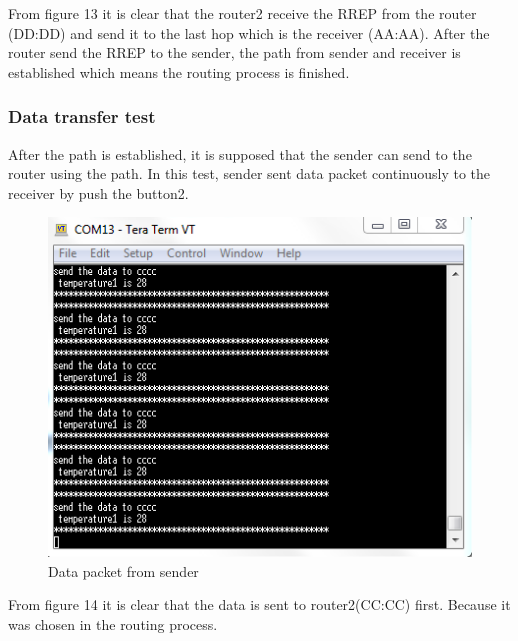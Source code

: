 \documentclass[a4paper]{article}
\begin{document}
From figure 13 it is clear that the router2 receive the RREP from the router (DD:DD) and send it to the last hop which is the receiver (AA:AA). After the router send the RREP to the sender, the path from sender and receiver is established which means the routing process is finished.

\subsubsection{Data transfer test}

After the path is established, it is supposed that the sender can send to the router using the path. In this test, sender sent data packet continuously to the receiver by push the button2. 

\begin{figure}[!htb]
   \centering
   \includegraphics[scale=0.8]{test6}
	\begin{center}
	   \caption{Data packet from sender}
	\end{center}	   
    \label{fig:test6}
\end{figure}

\newpage
From figure 14 it is clear that the data is sent to router2(CC:CC) first. Because it was chosen in the routing process.
\end{document}
